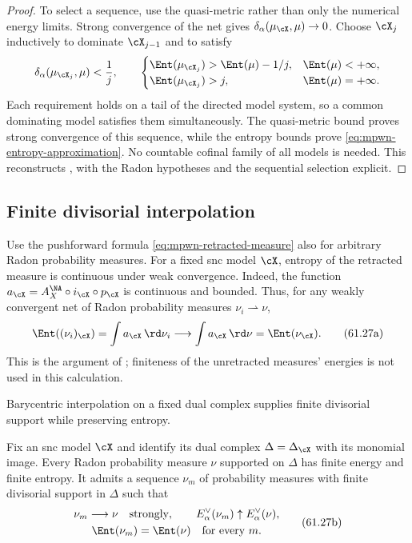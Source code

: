 \begin{proof}
To select a sequence, use the quasi-metric rather than only
the numerical energy limits.  Strong convergence of the net
gives $\delta_\alpha(\mu_{\cX},\mu)\to0$.
Choose $\cX_j$ inductively to dominate $\cX_{j-1}$ and to satisfy
\[
 \delta_\alpha(\mu_{\cX_j},\mu)<\frac1j,\qquad
 \begin{cases}
 \Ent(\mu_{\cX_j})>\Ent(\mu)-1/j,
                            &\Ent(\mu)<+\infty,\\
 \Ent(\mu_{\cX_j})>j,        &\Ent(\mu)=+\infty.
 \end{cases}
\]
Each requirement holds on a tail of the directed model system,
so a common dominating model satisfies them simultaneously.
The quasi-metric bound proves strong convergence of this
sequence, while the entropy bounds prove
\eqref{eq:mpwn-entropy-approximation}.
No countable cofinal family of all models is needed.
This reconstructs \cite[Lemmas~7.2.1--7.2.2 and
Corollary~7.2.3]{MPWN25}, with the Radon hypotheses and the
sequential selection explicit.
\end{proof}

\subsection{Finite divisorial interpolation}
\label{subsec:mpwn-atomic-measures}

Use the pushforward formula \eqref{eq:mpwn-retracted-measure} also for arbitrary Radon probability measures. For a fixed snc model $\cX$, entropy of the retracted measure is continuous under weak convergence. Indeed, the function $a_{\cX}=A_X^{\NA}\circ i_{\cX}\circ p_{\cX}$ is continuous and bounded. Thus, for any weakly convergent net of Radon probability measures $\nu_i\rightharpoonup\nu$,
\[
 \Ent((\nu_i)_{\cX})=\int a_{\cX}\,\rd\nu_i
       \longrightarrow\int a_{\cX}\,\rd\nu
       =\Ent(\nu_{\cX}).
\tag{61.27a}\label{eq:mpwn-fixed-model-entropy}
\]
This is the argument of \cite[Lemma~7.2.4, p.~28]{MPWN25}; finiteness of the unretracted measures' energies is not used in this calculation.

Barycentric interpolation on a fixed dual complex supplies finite divisorial support while preserving entropy.

\begin{proposition}\label{prop:mpwn-barycentric-measures}
Fix an snc model $\cX$ and identify its dual complex $\Delta=\Delta_{\cX}$ with its monomial image. Every Radon probability measure $\nu$ supported on $\Delta$ has finite energy and finite entropy. It admits a sequence $\nu_m$ of probability measures with finite divisorial support in $\Delta$ such that
\[
 \begin{gathered}
 \nu_m\longrightarrow\nu\quad\text{strongly},\qquad
 E_\alpha^\vee(\nu_m)\uparrow E_\alpha^\vee(\nu),\\
 \Ent(\nu_m)=\Ent(\nu)\quad\text{for every }m.
 \end{gathered}
\tag{61.27b}\label{eq:mpwn-barycentric-convergence}
\]
\end{proposition}

